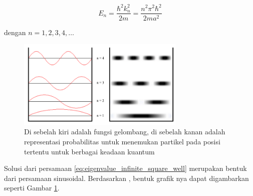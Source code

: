 \begin{equation} \label{eq:eigenvalue_infinite_square_well}
  E_n = \frac{\hbar^2 k_n^2}{2m} = \frac{n^2 \pi^2 \hbar^2}{2ma^2}
\end{equation}

dengan $n = 1, 2, 3, 4, \dots$

\begin{figure}[H]
  \centering
  \includegraphics[width=8cm]{images/solution_infinte_square_well.png}
  \caption{Di sebelah kiri adalah fungsi gelombang, di sebelah kanan adalah representasi probabilitas untuk menemukan partikel pada posisi tertentu untuk berbagai keadaan kuantum}
  \label{img:solution_infinite_square_well}
\end{figure}

\noindent
Solusi dari persamaan \ref{eq:eigenvalue_infinite_square_well} merupakan bentuk dari
persamaan sinusoidal. Berdasarkan \cite{dalessandrisSpiralModernPhysics2024},
bentuk grafik nya dapat digambarkan seperti Gambar \ref{img:solution_infinite_square_well}.




